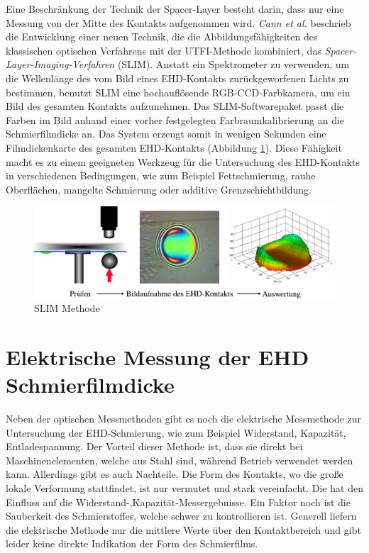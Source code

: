 Eine Beschränkung der Technik der Spacer-Layer besteht darin, dass nur eine Messung von der Mitte des Kontakts aufgenommen wird.
\textit{Cann et al.} \cite{cann_1996} beschrieb die Entwicklung einer neuen Technik, die die Abbildungsfähigkeiten des klassischen optischen Verfahrens mit der UTFI-Methode kombiniert, das \textit{Spacer-Layer-Imaging-Verfahren} (SLIM).
Anstatt ein Spektrometer zu verwenden, um die Wellenlänge des vom Bild eines EHD-Kontakts zurückgeworfenen Lichts zu bestimmen, benutzt SLIM eine hochauflösende RGB-CCD-Farbkamera, um ein Bild des gesamten Kontakts aufzunehmen.
Das SLIM-Softwarepaket passt die Farben im Bild anhand einer vorher festgelegten Farbraumkalibrierung an die Schmierfilmdicke an.
Das System erzeugt somit in wenigen Sekunden eine Filmdickenkarte des gesamten EHD-Kontakts (Abbildung \ref{fig:ehd_slim_methode}).
Diese Fähigkeit macht es zu einem geeigneten Werkzeug für die Untersuchung des EHD-Kontakts in verschiedenen Bedingungen, wie zum Beispiel Fettschmierung, rauhe Oberflächen, mangelte Schmierung oder additive Grenzschichtbildung.
\begin{figure}[htb]
    \centering
    \includegraphics[]{./images/slim_methode.pdf}
    \caption{SLIM Methode \cite{ehl_broshure}}
    \label{fig:ehd_slim_methode}
\end{figure}
%

\section{Elektrische Messung der EHD Schmierfilmdicke}
\label{sec:elektrische_messung_der_ehd_schmierfilmdicke}

Neben der optischen Messmethoden gibt es noch die elektrische Messmethode zur Untersuchung der EHD-Schmierung, wie zum Beispiel Widerstand, Kapazität, Entladespannung.
Der Vorteil dieser Methode ist, dass sie direkt bei Maschinenelementen, welche aus Stahl sind, während Betrieb verwendet werden kann.
Allerdings gibt es auch Nachteile.
Die Form des Kontakts, wo die große lokale Verformung stattfindet, ist nur vermutet und stark vereinfacht.
Die hat den Einfluss auf die Widerstand-,Kapazität-Messergebnisse.
Ein Faktor noch ist die Sauberkeit des Schmierstoffes, welche schwer zu kontrollieren ist.
Generell liefern die elektrische Methode nur die mittlere Werte über den Kontaktbereich und gibt leider keine direkte Indikation der Form des Schmierfilms.


